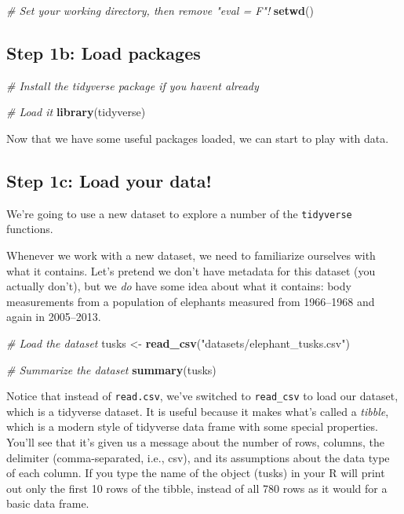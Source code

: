 \documentclass[
]{article}
\newenvironment{Shaded}{\begin{snugshade}}{\end{snugshade}}
\newcommand{\CommentTok}[1]{\textcolor[rgb]{0.56,0.35,0.01}{\textit{#1}}}
\newcommand{\FunctionTok}[1]{\textcolor[rgb]{0.13,0.29,0.53}{\textbf{#1}}}
\newcommand{\NormalTok}[1]{#1}
\newcommand{\OtherTok}[1]{\textcolor[rgb]{0.56,0.35,0.01}{#1}}
\newcommand{\StringTok}[1]{\textcolor[rgb]{0.31,0.60,0.02}{#1}}
\begin{document}
\begin{Shaded}
\begin{Highlighting}[]
\CommentTok{\# Set your working directory, then remove "eval = F"!}
\FunctionTok{setwd}\NormalTok{()}
\end{Highlighting}
\end{Shaded}

\subsection{Step 1b: Load packages}\label{step-1b-load-packages}

\begin{Shaded}
\begin{Highlighting}[]
\CommentTok{\# Install the tidyverse package if you haven\textquotesingle{}t already}

\CommentTok{\# Load it}
\FunctionTok{library}\NormalTok{(tidyverse) }
\end{Highlighting}
\end{Shaded}

Now that we have some useful packages loaded, we can start to play with
data.

\subsection{Step 1c: Load your data!}\label{step-1c-load-your-data}

We're going to use a new dataset to explore a number of the
\texttt{tidyverse} functions.

Whenever we work with a new dataset, we need to familiarize ourselves
with what it contains. Let's pretend we don't have metadata for this
dataset (you actually don't), but we \emph{do} have some idea about what
it contains: body measurements from a population of elephants measured
from 1966--1968 and again in 2005--2013.

\begin{Shaded}
\begin{Highlighting}[]
\CommentTok{\# Load the dataset}
\NormalTok{tusks }\OtherTok{\textless{}{-}} \FunctionTok{read\_csv}\NormalTok{(}\StringTok{"datasets/elephant\_tusks.csv"}\NormalTok{)}

\CommentTok{\# Summarize the dataset}
\FunctionTok{summary}\NormalTok{(tusks)}
\end{Highlighting}
\end{Shaded}

Notice that instead of \texttt{read.csv}, we've switched to
\texttt{read\_csv} to load our dataset, which is a tidyverse dataset. It
is useful because it makes what's called a \emph{tibble}, which is a
modern style of tidyverse data frame with some special properties.
You'll see that it's given us a message about the number of rows,
columns, the delimiter (comma-separated, i.e., csv), and its assumptions
about the data type of each column. If you type the name of the object
(tusks) in your R will print out only the first 10 rows of the tibble,
instead of all 780 rows as it would for a basic data frame.
\end{document}
